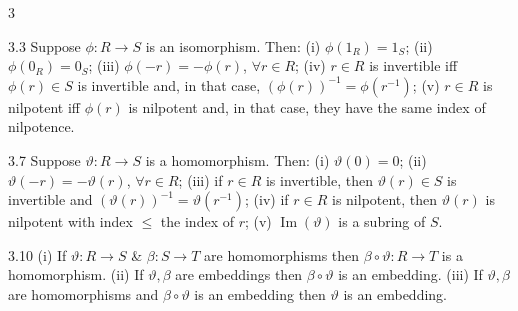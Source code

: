 \documentclass[8pt]{extarticle}
\begin{document}
\begin{multicols*}{3}
{{
            }
        }
        \vspace{-1pt}

        \begin{lemma}{3.3}
            Suppose \(\phi:R\to S\) is an isomorphism. Then: (i) \(\phi(1_R)=1_S\); (ii) \(\phi(0_R)=0_S\); (iii) \(\phi(-r)=-\phi(r)\), \(\forall r\in R\); (iv) \(r\in R\) is invertible iff \(\phi(r)\in S\) is invertible and, in that case, \((\phi(r))^{-1}=\phi(r^{-1})\); (v) \(r\in R\) is nilpotent iff \(\phi(r)\) is nilpotent and, in that case, they have the same index of nilpotence.
        \end{lemma}

        \begin{lemma}{3.7}
            Suppose \(\vartheta:R\to S\) is a homomorphism. Then: (i) \(\vartheta(0)=0\); (ii) \(\vartheta(-r)=-\vartheta(r)\), \(\forall r\in R\); (iii) if \(r\in R\) is invertible, then \(\vartheta(r)\in S\) is invertible and \((\vartheta(r))^{-1}=\vartheta(r^{-1})\); (iv) if \(r\in R\) is nilpotent, then \(\vartheta(r)\) is nilpotent with index \(\le\) the index of \(r\); (v) \(\operatorname{Im}(\vartheta)\) is a subring of \(S\).
        \end{lemma}

        \begin{lemma}{3.10}
            (i) If \(\vartheta:R\to S\) \& \(\beta:S\to T\) are homomorphisms then \(\beta\circ\vartheta:R\to T\) is a homomorphism. (ii) If \(\vartheta,\beta\) are embeddings then \(\beta\circ\vartheta\) is an embedding. (iii) If \(\vartheta,\beta\) are homomorphisms and \(\beta\circ\vartheta\) is an embedding then \(\vartheta\) is an embedding.
        \end{lemma}


\end{multicols*}
\end{document}
